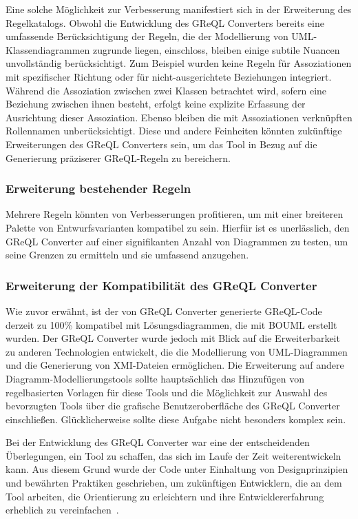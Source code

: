 Eine solche Möglichkeit zur Verbesserung manifestiert sich in der Erweiterung des Regelkatalogs. Obwohl die Entwicklung
des GReQL Converters bereits eine umfassende Berücksichtigung der Regeln, die der Modellierung von UML-Klassendiagrammen
zugrunde liegen, einschloss, bleiben einige subtile Nuancen unvollständig berücksichtigt. Zum Beispiel wurden keine
Regeln für Assoziationen mit spezifischer Richtung oder für nicht-ausgerichtete Beziehungen integriert. Während die
Assoziation zwischen zwei Klassen betrachtet wird, sofern eine Beziehung zwischen ihnen besteht, erfolgt keine explizite
Erfassung der Ausrichtung dieser Assoziation. Ebenso bleiben die mit Assoziationen verknüpften Rollennamen
unberücksichtigt. Diese und andere Feinheiten könnten zukünftige Erweiterungen des GReQL Converters sein, um das Tool
in Bezug auf die Generierung präziserer GReQL-Regeln zu bereichern.

\subsubsection{Erweiterung bestehender Regeln}

Mehrere Regeln könnten von Verbesserungen profitieren, um mit einer breiteren Palette von Entwurfsvarianten kompatibel
zu sein. Hierfür ist es unerlässlich, den GReQL Converter auf einer signifikanten Anzahl von Diagrammen zu testen, um
seine Grenzen zu ermitteln und sie umfassend anzugehen.


\subsubsection{Erweiterung der Kompatibilität des GReQL Converter}

Wie zuvor erwähnt, ist der von GReQL Converter generierte GReQL-Code derzeit zu 100\% kompatibel mit Lösungsdiagrammen,
die mit BOUML erstellt wurden. Der GReQL Converter wurde jedoch mit Blick auf die Erweiterbarkeit zu anderen
Technologien entwickelt, die die Modellierung von UML-Diagrammen und die Generierung von XMI-Dateien ermöglichen. Die
Erweiterung auf andere Diagramm-Modellierungstools sollte hauptsächlich das Hinzufügen von regelbasierten Vorlagen für
diese Tools und die Möglichkeit zur Auswahl des bevorzugten Tools über die grafische Benutzeroberfläche des GReQL
Converter einschließen. Glücklicherweise sollte diese Aufgabe nicht besonders komplex sein.


Bei der Entwicklung des GReQL Converter war eine der entscheidenden Überlegungen, ein Tool zu schaffen, das sich im
Laufe der Zeit weiterentwickeln kann. Aus diesem Grund wurde der Code unter Einhaltung von Designprinzipien und
bewährten Praktiken geschrieben, um zukünftigen Entwicklern, die an dem Tool arbeiten, die Orientierung zu erleichtern
und ihre Entwicklererfahrung erheblich zu vereinfachen~\cite{mcconnell2006software}.
